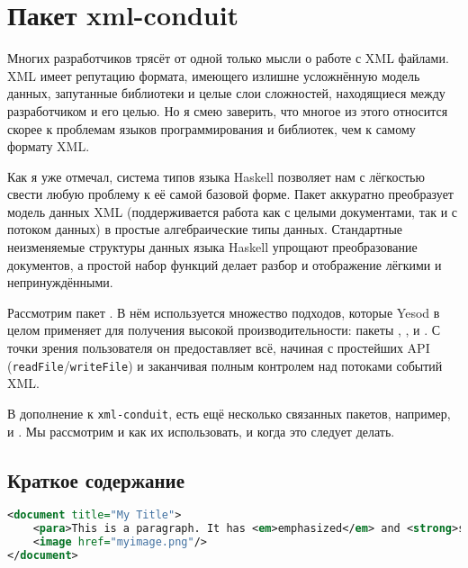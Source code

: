 \chapter{Пакет xml-conduit}

Многих разработчиков трясёт от одной только мысли о работе с XML файлами. XML имеет репутацию формата, имеющего излишне усложнённую модель данных, запутанные библиотеки и целые слои сложностей, находящиеся между разработчиком и его целью. Но я смею заверить, что многое из этого относится скорее к проблемам языков программирования и библиотек, чем к самому формату XML.

Как я уже отмечал, система типов языка Haskell позволяет нам с лёгкостью свести любую проблему к её самой базовой форме. Пакет  аккуратно преобразует модель данных XML (поддерживается работа как с целыми документами, так и с потоком данных) в простые алгебраические типы данных. Стандартные неизменяемые структуры данных языка Haskell упрощают преобразование документов, а простой набор функций делает разбор и отображение лёгкими и непринуждёнными.

Рассмотрим пакет . В нём используется множество подходов, которые Yesod в целом применяет для получения высокой производительности: пакеты , ,  и . С точки зрения пользователя он предоставляет всё, начиная с простейших API (\lstinline!readFile!/\lstinline!writeFile!) и заканчивая полным контролем над потоками событий XML.

В дополнение к \lstinline!xml-conduit!, есть ещё несколько связанных пакетов, например,  и . Мы рассмотрим и как их использовать, и когда это следует делать.

\section{Краткое содержание} %
\begin{lstlisting}[language=XML, caption={Входной XML файл}]
<document title="My Title">
    <para>This is a paragraph. It has <em>emphasized</em> and <strong>strong</strong> words.</para>
    <image href="myimage.png"/>
</document>
\end{lstlisting}

